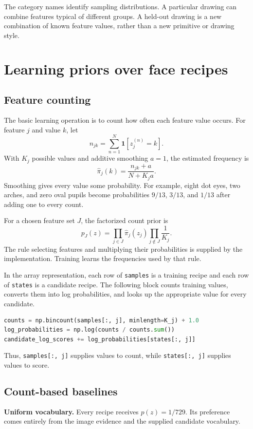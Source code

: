 \documentclass[11pt,letterpaper]{article}
\begin{document}
The category names identify sampling distributions. A particular drawing can combine features typical of different groups. A held-out drawing is a new combination of known feature values, rather than a new primitive or drawing style.

\section{Learning priors over face recipes}
\subsection{Feature counting}
The basic learning operation is to count how often each feature value occurs. For feature $j$ and value $k$, let
\begin{equation}
n_{jk}=\sum_{n=1}^{N}\mathbf 1[z_j^{(n)}=k].
\end{equation}
With $K_j$ possible values and additive smoothing $a=1$, the estimated frequency is
\begin{equation}
\widehat\pi_j(k)=\frac{n_{jk}+a}{N+K_ja}.
\label{eq:counts}
\end{equation}
Smoothing gives every value some probability. For example, eight dot eyes, two arches, and zero oval pupils become probabilities $9/13$, $3/13$, and $1/13$ after adding one to every count.

For a chosen feature set $J$, the factorized count prior is
\begin{equation}
p_J(z)=\prod_{j\in J}\widehat\pi_j(z_j)
\prod_{j\notin J}\frac{1}{K_j}.
\label{eq:pooled}
\end{equation}
The rule selecting features and multiplying their probabilities is supplied by the implementation. Training learns the frequencies used by that rule.

In the array representation, each row of \texttt{samples} is a training recipe and each row of \texttt{states} is a candidate recipe. The following block counts training values, converts them into log probabilities, and looks up the appropriate value for every candidate.
\begin{lstlisting}[language=Python]
counts = np.bincount(samples[:, j], minlength=K_j) + 1.0
log_probabilities = np.log(counts / counts.sum())
candidate_log_scores += log_probabilities[states[:, j]]
\end{lstlisting}
Thus, \texttt{samples[:, j]} supplies values to count, while \texttt{states[:, j]} supplies values to score.

\subsection{Count-based baselines}
\textbf{Uniform vocabulary.} Every recipe receives $p(z)=1/729$. Its preference comes entirely from the image evidence and the supplied candidate vocabulary.
\end{document}
